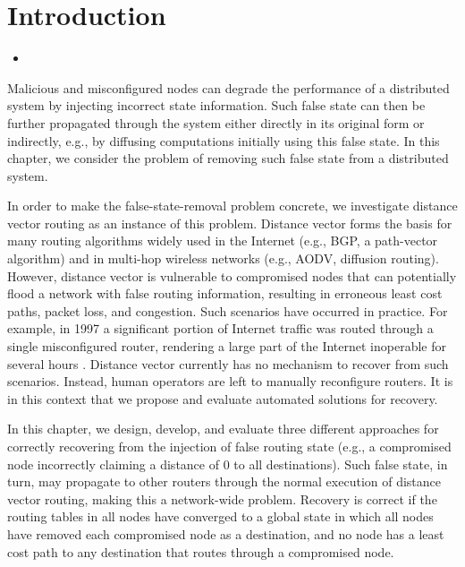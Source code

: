 
\section{Introduction}
\label{sec:intro}

\begin{framed}
\begin{itemize}
	\item {}
\end{itemize}
\end{framed}

Malicious and misconfigured nodes can degrade the performance of a distributed system by injecting incorrect state information. Such false state can then be further propagated 
through the system either directly in its original form or indirectly, e.g., by diffusing computations initially using this false state.  In this chapter, we consider 
the problem of removing such false state from a distributed system.

In order to make the false-state-removal problem concrete, we investigate distance vector routing as an instance of this problem. Distance vector forms the basis for many routing 
algorithms widely used in the Internet (e.g., BGP, a path-vector algorithm) and in multi-hop wireless networks (e.g., AODV, diffusion routing). However, distance vector is vulnerable 
to compromised nodes that can potentially flood a network with false routing information, resulting in erroneous least cost paths, packet loss, and congestion. Such scenarios have occurred in practice. 
For example, in 1997 a significant portion of Internet traffic was routed through a single misconfigured router, rendering a large part of the Internet inoperable for several hours \cite{Neumann97}. 
Distance vector currently has no mechanism to recover from such scenarios. Instead, human operators are left to manually reconfigure routers. It is in this context that we propose and
evaluate automated solutions for recovery.

In this chapter, we design, develop, and evaluate three different approaches for correctly recovering from the injection of false routing state (e.g., a compromised node incorrectly
claiming a distance of $0$ to all destinations). Such false state, in turn, may propagate to other routers through the normal execution of distance vector routing, making this
a network-wide problem. Recovery is correct if the routing tables in all nodes have converged to a global state in which all nodes have removed each compromised node as a destination,
and no node has a least cost path to any destination that routes through a compromised node.

